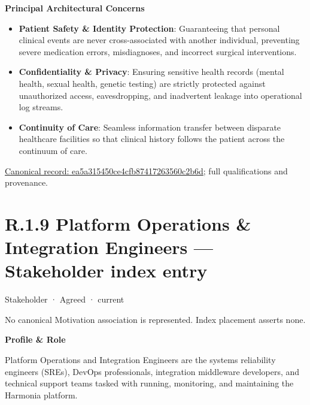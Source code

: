 \par\medskip\textbf{Principal Architectural Concerns}\par


\begin{itemize}


\item \textbf{Patient Safety \& Identity Protection}: Guaranteeing that personal clinical events are never cross-associated with another individual, preventing severe medication errors, misdiagnoses, and incorrect surgical interventions.

\item \textbf{Confidentiality \& Privacy}: Ensuring sensitive health records (mental health, sexual health, genetic testing) are strictly protected against unauthorized access, eavesdropping, and inadvertent leakage into operational log streams.

\item \textbf{Continuity of Care}: Seamless information transfer between disparate healthcare facilities so that clinical history follows the patient across the continuum of care.

\end{itemize}

{\footnotesize \href{../../../../continuum/motivation/stakeholder/ea5a315450ce4cfb87417263560c2b6d.md}{Canonical record: ea5a315450ce4cfb87417263560c2b6d}; full qualifications and provenance.}\par
\section*{R.1.9 Platform Operations \& Integration Engineers — Stakeholder index entry}
\label{navigation:R.1.9}

\label{element:c20aa17ce4aa4a58be5eb3cff2ecdd1d}
{\small Stakeholder · Agreed · current}\par
No canonical Motivation association is represented. Index placement asserts none.\par

\par\medskip\textbf{Profile \& Role}\par


Platform Operations and Integration Engineers are the systems reliability engineers (SREs), DevOps professionals, integration middleware developers, and technical support teams tasked with running, monitoring, and maintaining the Harmonia platform.



